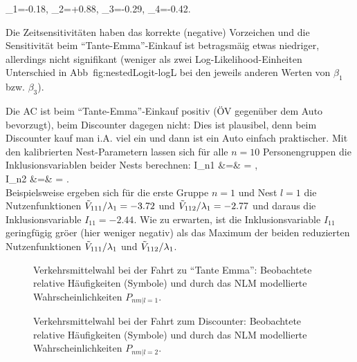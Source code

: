 \bdm
\hatbeta_1=-0.18, \quad
\hatbeta_2=+0.88, \quad
\hatbeta_3=-0.29, \quad
\hatbeta_4=-0.42.
\edm
\bi
\item Die Zeitsensitivit\"aten haben das korrekte (negative) Vorzeichen und
die Sensitivit\"at beim ``Tante-Emma''-Einkauf ist
betragsm\"a\3ig etwas niedriger, allerdings nicht signifikant (weniger
als zwei Log-Likelihood-Einheiten Unterschied in
Abb~{fig:nestedLogit-logL} bei den jeweils anderen Werten von
$\beta_1$ bzw. $\beta_3$).
\item Die AC ist beim ``Tante-Emma''-Einkauf positiv (\"OV gegen\"uber
  dem Auto bevorzugt), beim Discounter dagegen nicht: Dies ist
  plausibel, denn beim Discounter  kauf man i.A.
  viel ein und dann ist ein Auto einfach praktischer.
\ei
Mit den kalibrierten Nest-Parametern lassen sich f\"ur alle $n=10$
Personengruppen die Inklusionsvariablen beider Nests berechnen:
\bdma
I_{n1} &=& \ln{}
 = \ln{},\\
I_{n2} &=& \ln{}
  = \ln{}.\\
\edma
Beispielsweise ergeben sich f\"ur die erste Gruppe $n=1$ und Nest $l=1$
die Nutzenfunktionen $\tilde{V}_{111}/\lambda_1=-3.72$ und
$\tilde{V}_{112}/\lambda_1=-2.77$ und daraus die Inklusionsvariable
$I_{11}= -2.44$. Wie zu erwarten, ist die Inklusionsvariable $I_{11}$
geringf\"ugig gr\"o\3er (hier weniger negativ) als das Maximum der
beiden reduzierten Nutzenfunktionen $\tilde{V}_{111}/\lambda_1$ und
$\tilde{V}_{112}/\lambda_1$. 

\begin{figure}
\caption{\label{fig:nestedLogit-Nest1}Verkehrsmittelwahl bei der Fahrt
  zu ``Tante Emma'': Beobachtete relative
  H\"aufigkeiten (Symbole) und durch das NLM modellierte
  Wahrscheinlichkeiten $P_{nm|l=1}$.
}
\end{figure}


\begin{figure}
\caption{\label{fig:nestedLogit-Nest2}Verkehrsmittelwahl bei der Fahrt
  zum Discounter: Beobachtete relative
  H\"aufigkeiten (Symbole) und durch das NLM modellierte
  Wahrscheinlichkeiten $P_{nm|l=2}$.
}
\end{figure}


